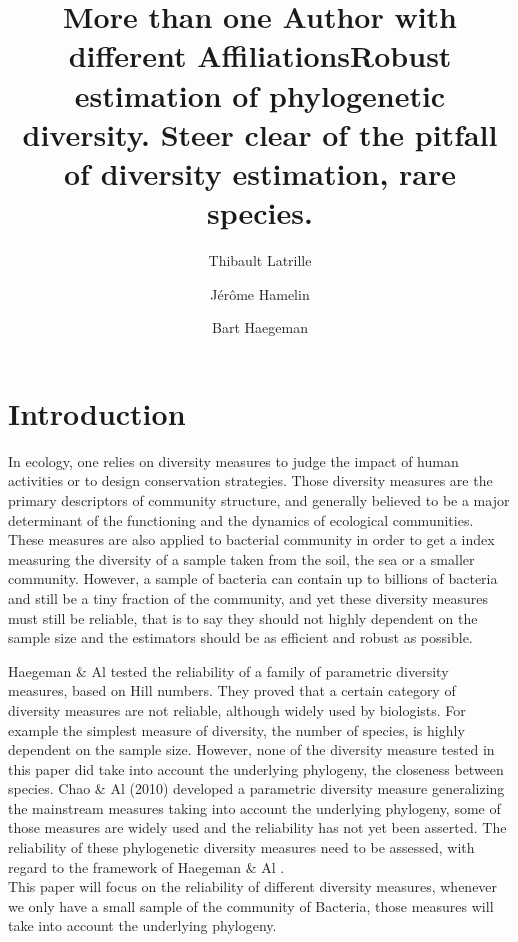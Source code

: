 \documentclass{article}
\title{More than one Author with different Affiliations}
\author[*]{Thibault Latrille}
\author[**]{Jérôme Hamelin}
\author[**]{Bart Haegeman}
\affil[*]{École normale supérieure de Lyon, France}
\affil[**]{Laboratoire de Biotechnologie de l'Environnement (LBE), INRA Narbonne, France}
\title{Robust estimation of phylogenetic diversity. Steer clear of the pitfall of diversity estimation, rare species.}
\begin{document}
\maketitle 


\section{Introduction}
In ecology, one relies on diversity measures to
judge the impact of human activities or to design conservation strategies. Those diversity measures are the primary descriptors of community structure, and generally believed to be a major determinant of the functioning and the dynamics of ecological communities. These measures are also applied to bacterial community in order to get a index measuring the diversity of a sample taken from the soil, the sea or a smaller community. However, a sample of bacteria can contain up to billions of bacteria and still be a tiny fraction of the community, and yet these diversity measures must still be reliable, that is to say they should not highly dependent on the sample size and the estimators should be as efficient and robust as possible.

Haegeman \& Al \cite{Haegeman2013} tested the reliability of a family of parametric diversity measures, based on Hill numbers. They proved that a certain category of diversity measures are not reliable, although widely used by biologists. For example the simplest measure of diversity, the number of species, is highly dependent on the sample size. However, none of the diversity measure tested in this paper did take into account the underlying phylogeny, the closeness between species. Chao \& Al (2010) \cite{Chao2010} developed a parametric diversity measure generalizing the mainstream measures taking into account the underlying phylogeny, some of those measures are widely used and the reliability has not yet been asserted. The reliability of these phylogenetic diversity measures need to be assessed, with regard to the framework of Haegeman \& Al \cite{Haegeman2013}.
\\

This paper will focus on the reliability of different diversity measures, whenever we only have a small sample of the community of Bacteria, those measures will take into account the underlying phylogeny. 



\end{document}
